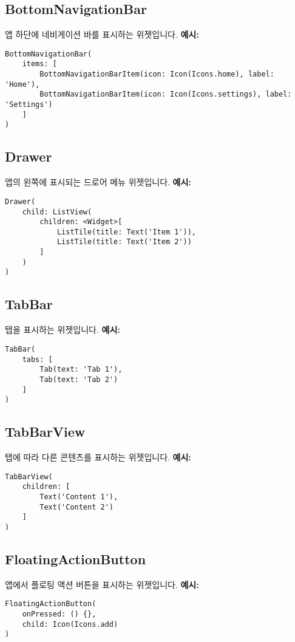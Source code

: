 \documentclass{article}
\begin{document}
\subsection*{BottomNavigationBar}
앱 하단에 네비게이션 바를 표시하는 위젯입니다.
\textbf{예시:}
\begin{lstlisting}
BottomNavigationBar(
    items: [
        BottomNavigationBarItem(icon: Icon(Icons.home), label: 'Home'),
        BottomNavigationBarItem(icon: Icon(Icons.settings), label: 'Settings')
    ]
)
\end{lstlisting}

\subsection*{Drawer}
앱의 왼쪽에 표시되는 드로어 메뉴 위젯입니다.
\textbf{예시:}
\begin{lstlisting}
Drawer(
    child: ListView(
        children: <Widget>[
            ListTile(title: Text('Item 1')),
            ListTile(title: Text('Item 2'))
        ]
    )
)
\end{lstlisting}

\subsection*{TabBar}
탭을 표시하는 위젯입니다.
\textbf{예시:}
\begin{lstlisting}
TabBar(
    tabs: [
        Tab(text: 'Tab 1'),
        Tab(text: 'Tab 2')
    ]
)
\end{lstlisting}

\subsection*{TabBarView}
탭에 따라 다른 콘텐츠를 표시하는 위젯입니다.
\textbf{예시:}
\begin{lstlisting}
TabBarView(
    children: [
        Text('Content 1'),
        Text('Content 2')
    ]
)
\end{lstlisting}

\subsection*{FloatingActionButton}
앱에서 플로팅 액션 버튼을 표시하는 위젯입니다.
\textbf{예시:}
\begin{lstlisting}
FloatingActionButton(
    onPressed: () {},
    child: Icon(Icons.add)
)
\end{lstlisting}
\end{document}
